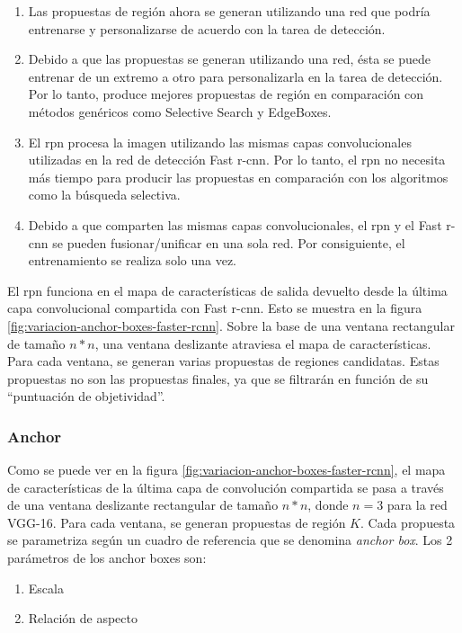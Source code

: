 \begin{enumerate}
    \item Las propuestas de región ahora se generan utilizando una red que podría entrenarse y personalizarse de acuerdo con la tarea de detección.
    \item Debido a que las propuestas se generan utilizando una red, ésta se puede entrenar de un extremo a otro para personalizarla en la tarea de detección. Por lo tanto, produce mejores propuestas de región en comparación con métodos genéricos como Selective Search y EdgeBoxes.
    \item El \gls{rpn} procesa la imagen utilizando las mismas capas convolucionales utilizadas en la red de detección Fast \gls{r-cnn}. Por lo tanto, el \gls{rpn} no necesita más tiempo para producir las propuestas en comparación con los algoritmos como la búsqueda selectiva.
    \item Debido a que comparten las mismas capas convolucionales, el \gls{rpn} y el Fast \gls{r-cnn} se pueden fusionar/unificar en una sola red. Por consiguiente, el entrenamiento se realiza solo una vez.
\end{enumerate}

El \gls{rpn} funciona en el mapa de características de salida devuelto desde la última capa convolucional compartida con Fast \gls{r-cnn}. Esto se muestra en la figura \ref{fig:variacion-anchor-boxes-faster-rcnn}. Sobre la base de una ventana rectangular de tamaño $n*n$, una ventana deslizante atraviesa el mapa de características. Para cada ventana, se generan varias propuestas de regiones candidatas. Estas propuestas no son las propuestas finales, ya que se filtrarán en función de su ``puntuación de objetividad''.

\subsubsection*{Anchor}
\label{subsubsec:anchor-faster-rcnn}

Como se puede ver en la figura \ref{fig:variacion-anchor-boxes-faster-rcnn}, el mapa de características de la última capa de convolución compartida se pasa a través de una ventana deslizante rectangular de tamaño $n*n$, donde $n = 3$ para la red VGG-16. Para cada ventana, se generan propuestas de región $K$. Cada propuesta se parametriza según un cuadro de referencia que se denomina \textit{anchor box}. Los 2 parámetros de los anchor boxes son:

\begin{enumerate}
    \item Escala
    \item Relación de aspecto
\end{enumerate}

